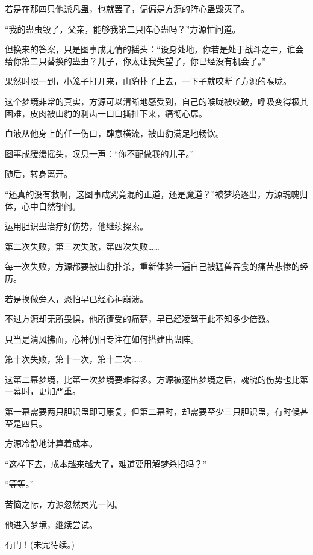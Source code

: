 \begin{this_body}
若是在那四只他派凡蛊，也就罢了，偏偏是方源的阵心蛊毁灭了。

“我的蛊虫毁了，父亲，能够我第二只阵心蛊吗？”方源忙问道。

但换来的答案，只是图事成无情的摇头：“设身处地，你若是处于战斗之中，谁会给你第二只替换的蛊虫？儿子，你太让我失望了，你已经没有机会了。”

果然时限一到，小笼子打开来，山豹扑了上去，一下子就咬断了方源的喉咙。

这个梦境非常的真实，方源可以清晰地感受到，自己的喉咙被咬破，呼吸变得极其困难，皮肉被山豹的利齿一口口撕扯下来，痛彻心扉。

血液从他身上的任一伤口，肆意横流，被山豹满足地畅饮。

图事成缓缓摇头，叹息一声：“你不配做我的儿子。”

随后，转身离开。

“还真的没有救啊，这图事成究竟混的正道，还是魔道？”被梦境逐出，方源魂魄归体，心中自然郁闷。

运用胆识蛊治疗好伤势，他继续探索。

第二次失败，第三次失败，第四次失败……

每一次失败，方源都要被山豹扑杀，重新体验一遍自己被猛兽吞食的痛苦悲惨的经历。

若是换做旁人，恐怕早已经心神崩溃。

不过方源却无所畏惧，他所遭受的痛楚，早已经凌驾于此不知多少倍数。

只当是清风拂面，心神仍旧专注在如何搭建出蛊阵。

第十次失败，第十一次，第十二次……

这第二幕梦境，比第一次梦境要难得多。方源被逐出梦境之后，魂魄的伤势也比第一幕时，更加严重。

第一幕需要两只胆识蛊即可康复，但第二幕时，却需要至少三只胆识蛊，有时候甚至是四只。

方源冷静地计算着成本。

“这样下去，成本越来越大了，难道要用解梦杀招吗？”

“等等。”

苦恼之际，方源忽然灵光一闪。

他进入梦境，继续尝试。

有门！(未完待续。)

\end{this_body}

